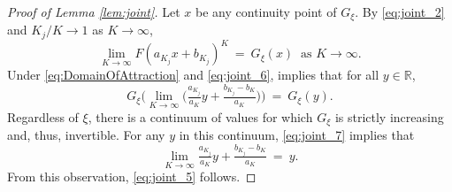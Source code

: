 \begin{proof}[Proof of Lemma \ref{lem:joint}]
Let $x$ be any continuity point of $G_{\xi }$. By \eqref{eq:joint_2} and $K_{j}/K\to 1$ as $K\to \infty$,
\begin{equation}
\lim_{K \to \infty} F( a_{K_{j}}x+b_{K_{j}}) ^{K}~=~ G_{\xi }( x) ~\text{ as }K\to \infty . \label{eq:joint_6}
\end{equation}
Under \eqref{eq:DomainOfAttraction} and \eqref{eq:joint_6}, \citet[Lemma 1]{dehaan1976} implies that for all $ y\in \mathbb{R}$,
\begin{equation}
G_{\xi }\big( \lim_{K\to \infty }\big( \tfrac{a_{K_{j}}}{a_{K}}y+ \tfrac{b_{K_{j}}-b_{K}}{a_{K}}\big) \big) ~=~G_{\xi }( y) . \label{eq:joint_7}
\end{equation}
Regardless of $\xi$, there is a continuum of values for which $G_{\xi }$ is strictly increasing and, thus, invertible. For any $y$ in this continuum, \eqref{eq:joint_7} implies that%
\begin{equation}
\lim_{K \to \infty}  \tfrac{a_{K_{j}}}{a_{K}}y+\tfrac{ b_{K_{j}}-b_{K}}{a_{K}} ~=~y . \label{eq:joint_8}
\end{equation}
From this observation, \eqref{eq:joint_5} follows.
\end{proof}

